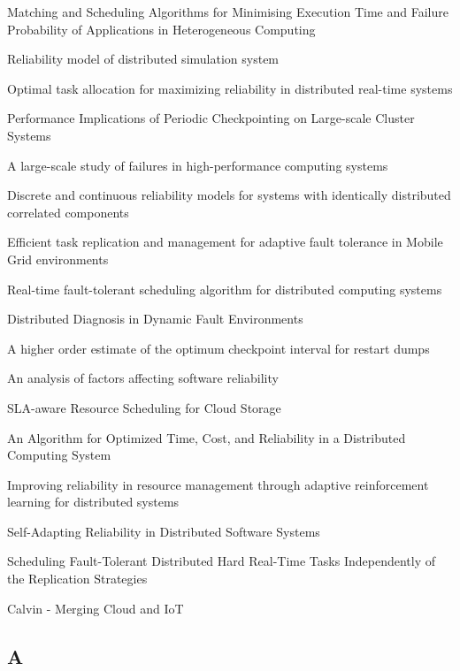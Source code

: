 \documentclass{cslthse-msc}
\begin{document}
\begin{thebibliography}{50}
Matching and Scheduling Algorithms for Minimising Execution Time and Failure Probability of Applications in Heterogeneous Computing

Reliability model of distributed simulation system

Optimal task allocation for maximizing reliability in distributed real-time systems

Performance Implications of Periodic Checkpointing on Large-scale Cluster Systems

A large-scale study of failures in high-performance computing systems

Discrete and continuous reliability models for systems with identically distributed correlated components

Efficient task replication and management for adaptive fault tolerance in Mobile Grid environments

Real-time fault-tolerant scheduling algorithm for distributed computing systems

Distributed Diagnosis in Dynamic Fault Environments

A higher order estimate of the optimum checkpoint interval for restart dumps

An analysis of factors affecting software reliability

SLA-aware Resource Scheduling for Cloud Storage

An Algorithm for Optimized Time, Cost, and Reliability in a Distributed Computing System

Improving reliability in resource management through adaptive reinforcement learning for distributed systems

Self-Adapting Reliability in Distributed Software Systems

Scheduling Fault-Tolerant Distributed Hard Real-Time Tasks Independently of the Replication Strategies

Calvin - Merging Cloud and IoT

\end{thebibliography}

\begin{appendices}
\chapter{A}

\end{appendices}
\end{document}
